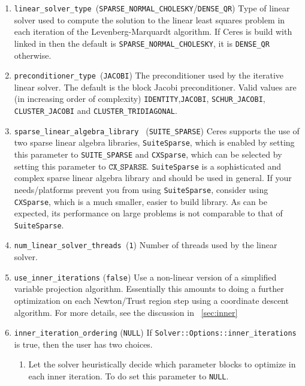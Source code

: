 \begin{enumerate}
\item{\texttt{linear\_solver\_type
    }}(\texttt{SPARSE\_NORMAL\_CHOLESKY}/\texttt{DENSE\_QR}) Type of
  linear solver used to compute the solution to the linear least
  squares problem in each iteration of the Levenberg-Marquardt
  algorithm. If Ceres is build with \suitesparse linked in  then the
  default is \texttt{SPARSE\_NORMAL\_CHOLESKY}, it is
  \texttt{DENSE\_QR} otherwise.

\item{\texttt{preconditioner\_type }}(\texttt{JACOBI}) The
  preconditioner used by the iterative linear solver. The default is
  the block Jacobi preconditioner. Valid values are (in increasing
  order of complexity) \texttt{IDENTITY},\texttt{JACOBI},
  \texttt{SCHUR\_JACOBI}, \texttt{CLUSTER\_JACOBI} and
  \texttt{CLUSTER\_TRIDIAGONAL}.

\item{\texttt{sparse\_linear\_algebra\_library }
    (\texttt{SUITE\_SPARSE})} Ceres supports the use of two sparse
  linear algebra libraries, \texttt{SuiteSparse}, which is enabled by
  setting this parameter to \texttt{SUITE\_SPARSE} and
  \texttt{CXSparse}, which can be selected by setting this parameter
  to $\texttt{CX\_SPARSE}$. \texttt{SuiteSparse} is a sophisticated
  and complex sparse linear algebra library and should be used in
  general. If your needs/platforms prevent you from using
  \texttt{SuiteSparse}, consider using \texttt{CXSparse}, which is a
  much smaller, easier to build library. As can be expected, its
  performance on large problems is not comparable to that of
  \texttt{SuiteSparse}.


\item{\texttt{num\_linear\_solver\_threads }}(\texttt{1}) Number of
  threads used by the linear solver.

\item{\texttt{use\_inner\_iterations} (\texttt{false}) } Use a
  non-linear version of a simplified variable projection
  algorithm. Essentially this amounts to doing a further optimization
  on each Newton/Trust region step using a coordinate descent
  algorithm.  For more details, see the discussion in ~\ref{sec:inner}

\item{\texttt{inner\_iteration\_ordering} (\texttt{NULL})} If
  \texttt{Solver::Options::inner\_iterations} is true, then the user
  has two choices.

\begin{enumerate}
\item Let the solver heuristically decide which parameter blocks to
  optimize in each inner iteration. To do set this parameter to
  {\texttt{NULL}}.


\end{enumerate}
\end{enumerate}
